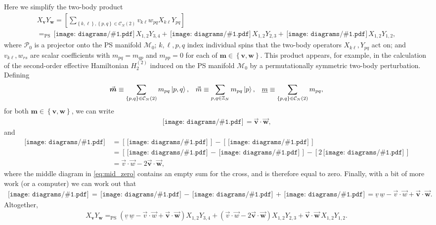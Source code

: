 \documentclass[nofootinbib,notitlepage,11pt]{revtex4-2}
\newcommand{\p}[1]{\left(#1\right)} %
\renewcommand{\sp}[1]{\left[#1\right]} %
\renewcommand{\set}[1]{\left\{#1\right\}} %
\renewcommand{\c}{\cdot} %
\newcommand{\m}{\bm} %
\renewcommand{\v}{\vec} %
\newcommand{\1}{\mathds{1}}
\newcommand{\C}{\mathcal{C}}
\newcommand{\M}{\mathcal{M}}
\renewcommand{\P}{\mathcal{P}}
\newcommand{\ZZ}{\mathbb{Z}}
\newcommand{\EQPS}{=_{\text{PS}}}
\newcommand{\col}{\underline}
\newcommand{\diagram}[1]
{\,\texttt{[image: diagrams/\#1.pdf]}\,}
\begin{document}
Here we simplify the two-body product
\begin{multline}
  X_{\m v} Y_{\m w} = \sp{\sum_{\set{k,\ell},\set{p,q}\in\C_N\p{2}}
    v_{k\ell} w_{pq} X_{k\ell} Y_{pq}} \\
  \EQPS \diagram{two_body_0} X_{1,2} Y_{3,4} + \diagram{two_body_1}
  X_{1,2} Y_{2,3} + \diagram{two_body_2} X_{1,2} Y_{1,2},
\end{multline}
where $\P_0$ is a projector onto the PS manifold $\M_0$; $k,\ell,p,q$
index individual spins that the two-body operators $X_{k\ell},Y_{pq}$
act on; and $v_{k\ell},w_{rs}$ are scalar coefficients with
$m_{pq}=m_{qp}$ and $m_{pp}=0$ for each of $\m m\in\set{\m v,\m w}$.
This product appears, for example, in the calculation of the
second-order effective Hamiltonian $H_2^{(2)}$ induced on the PS
manifold $\M_0$ by a permutationally symmetric two-body perturbation.
Defining
\begin{align}
  \v{\m m} \equiv \sum_{\set{p,q}\in\C_N\p{2}} m_{pq} \ket{p,q},
  &&
  \v m \equiv \sum_{p,q\in\ZZ_N} m_{pq} \ket{p},
  &&
  \col{m} \equiv \sum_{\set{p,q}\in\C_N\p{2}} m_{pq},
\end{align}
for both $\m m\in\set{\m v,\m w}$, we can write
\begin{align}
  \diagram{two_body_2} = \v{\m v} \c\v{\m w},
\end{align}
and
\begin{align}
  \diagram{two_body_1}
  &= \sp{\diagram{two_body_1_o}} - \sp{\diagram{two_body_1_x}} \\
  &= \sp{\diagram{two_body_1_oo} - \diagram{two_body_1_ox}}
  - \sp{2\diagram{two_body_2}} \label{eq:mid_zero} \\
  &= \v v \c \v w - 2 \v{\m v} \c \v{\m w},
\end{align}
where the middle diagram in \eqref{eq:mid_zero} contains an empty sum
for the cross, and is therefore equal to zero.  Finally, with a bit of
more work (or a computer) we can work out that
\begin{align}
  \diagram{two_body_0}
  = \diagram{two_body_0_oooo} - \diagram{two_body_1_ooo}
  + \diagram{two_body_2_oo}
  = \col{v}\,\col{w} - \v v\c\v w + \v{\m v}\c\v{\m w}.
\end{align}
Altogether,
\begin{align}
  X_{\m v} Y_{\m w}
  \EQPS \p{\col{v}\,\col{w} - \v v\c\v w + \v{\m v}\c\v{\m w}}
  X_{1,2} Y_{3,4}
  + \p{\v v\c\v w - 2 \v{\m v} \c \v{\m w}} X_{1,2} Y_{2,3}
  + \v{\m v} \c \v{\m w}\, X_{1,2} Y_{1,2}.
\end{align}
\end{document}

